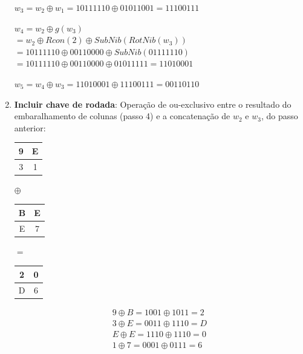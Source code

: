 \documentclass{article}
\begin{document}
\begin{enumerate}
    $w_{3} = w_{2} \oplus w_{1} = 10111110 \oplus 01011001 = 11100111$
    
    $w_{4} = w_{2} \oplus g(w_{3})$ \\
    $= w_{2} \oplus Rcon(2) \oplus SubNib(RotNib(w_{3}))$ \\
    $= 10111110 \oplus 00110000 \oplus SubNib(01111110)$ \\
    $= 10111110 \oplus 00110000 \oplus 01011111 = 11010001$
    
    $w_{5} = w_{4} \oplus w_{3} = 11010001 \oplus 11100111 = 00110110$
    
    \item \textbf{Incluir chave de rodada}: Operação de ou-exclusivo entre o
    resultado do embaralhamento de colunas (passo 4) e a concatenação de
    $w_{2}$ e $w_{3}$, do passo anterior:
    
    \begin{center}
        \begin{tabular}{|c|c|}
            \hline
            9 & E  \\
            \hline
            3 & 1 \\
            \hline
        \end{tabular}
        $\oplus$
        \begin{tabular}{|c|c|}
            \hline
            B & E  \\
            \hline
            E & 7 \\
            \hline
        \end{tabular}
        $=$
        \begin{tabular}{|c|c|}
            \hline
            2 & 0  \\
            \hline
            D & 6 \\
            \hline
        \end{tabular}
    \end{center}
    \begin{gather*}
        9 \oplus B = 1001 \oplus 1011 = 2 \\
        3 \oplus E = 0011 \oplus 1110 = D \\
        E \oplus E = 1110 \oplus 1110 = 0 \\
        1 \oplus 7 = 0001 \oplus 0111 = 6
    \end{gather*}
    

\end{enumerate}
\end{document}
